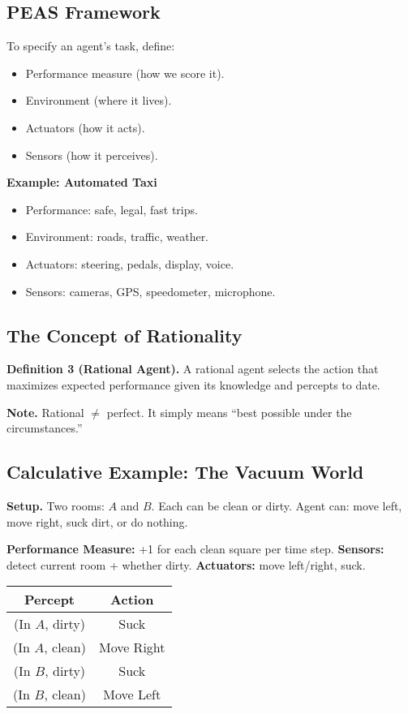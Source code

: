 \documentclass[12pt]{article}
\theoremstyle{definition}
\begin{document}
\subsection*{PEAS Framework}
To specify an agent’s task, define:
\begin{itemize}[noitemsep]
    \item Performance measure (how we score it).
    \item Environment (where it lives).
    \item Actuators (how it acts).
    \item Sensors (how it perceives).
\end{itemize}

\textbf{Example: Automated Taxi}
\begin{itemize}[noitemsep]
    \item Performance: safe, legal, fast trips.
    \item Environment: roads, traffic, weather.
    \item Actuators: steering, pedals, display, voice.
    \item Sensors: cameras, GPS, speedometer, microphone.
\end{itemize}

\subsection*{The Concept of Rationality}
\textbf{Definition 3 (Rational Agent).}  
A rational agent selects the action that maximizes expected performance given its knowledge
and percepts to date.

\textbf{Note.} Rational $\neq$ perfect. It simply means ``best possible under the circumstances.''

\subsection*{Calculative Example: The Vacuum World}
\textbf{Setup.} Two rooms: $A$ and $B$. Each can be clean or dirty.  
Agent can: move left, move right, suck dirt, or do nothing.

\medskip
\noindent
\textbf{Performance Measure:} +1 for each clean square per time step.  
\textbf{Sensors:} detect current room + whether dirty.  
\textbf{Actuators:} move left/right, suck.

\begin{center}
\begin{tabular}{|c|c|}
    \hline
    Percept & Action \\
    \hline
    (In $A$, dirty) & Suck \\
    (In $A$, clean) & Move Right \\
    (In $B$, dirty) & Suck \\
    (In $B$, clean) & Move Left \\
    \hline
\end{tabular}
\end{center}
\end{document}

